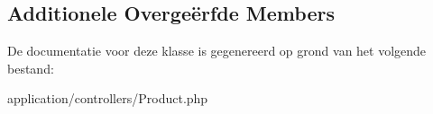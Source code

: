 \subsection*{Additionele Overge\"{e}rfde Members}


De documentatie voor deze klasse is gegenereerd op grond van het volgende bestand\+:\begin{DoxyCompactItemize}
\item 
application/controllers/Product.\+php\end{DoxyCompactItemize}
